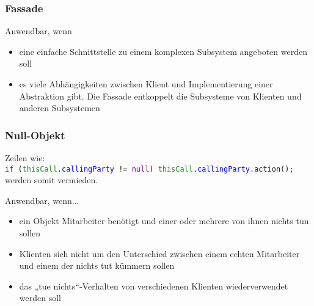 \subsubsection{Fassade}
Anwendbar, wenn
\begin{itemize}
    \item eine einfache Schnittstelle zu einem komplexen Subsystem angeboten werden soll
    \item es viele Abhängigkeiten zwischen Klient und Implementierung einer Abstraktion gibt. Die Fassade entkoppelt die Subsysteme von Klienten und anderen Subsystemen
\end{itemize}

\newpage
\subsubsection{Null-Objekt}
Zeilen wie:\\
\texttt{\textcolor{purple}{if} (\textcolor{ForestGreen}{thisCall}.\textcolor{blue}{callingParty} != \textcolor{purple}{null}) \textcolor{ForestGreen}{thisCall}.\textcolor{blue}{callingParty}.action();}\\
werden somit vermieden.\\

Anwendbar, wenn...
\begin{itemize}
    \item ein Objekt Mitarbeiter benötigt und einer oder mehrere von ihnen nichts tun sollen
    \item Klienten sich nicht um den Unterschied zwischen einem echten Mitarbeiter und einem der nichts tut kümmern sollen
    \item das „tue nichts“-Verhalten von verschiedenen Klienten wiederverwendet werden soll
\end{itemize}
